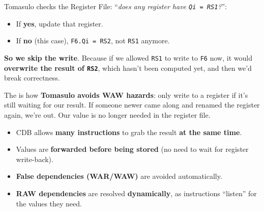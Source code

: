 \begin{examplebox}
\begin{equation*}
    \end{equation*}
    Tomasulo checks the Register File: ``\emph{does any register have \texttt{Qi = RS1}?}'':
    \begin{itemize}
        \item[\textcolor{Green3}{\faIcon{check-circle}}] If \textcolor{Green3}{\textbf{yes}}, update that register.
        \item[\textcolor{Red2}{\faIcon{times-circle}}] If \textcolor{Red2}{\textbf{no}} (this case), \texttt{F6.Qi = RS2}, not \texttt{RS1} anymore.
    \end{itemize}
    \textbf{So we skip the write}. Because if we allowed \texttt{RS1} to write to \texttt{F6} now, it would \textbf{overwrite the result of \texttt{RS2}}, which hasn't been computed yet, and then we'd break correctness.

    The is how \textbf{Tomasulo avoids WAW hazards}: only write to a register if it's still waiting for our result. If someone newer came along and renamed the register again, we're out. Our value is no longer needed in the register file.
\end{examplebox}

\begin{itemize}
    \item CDB allows \textbf{many instructions} to grab the result \textbf{at the same time}.
    \item Values are \textbf{forwarded before being stored} (no need to wait for register write-back).
    \item \textbf{False dependencies (WAR/WAW)} are avoided automatically.
    \item \textbf{RAW dependencies} are resolved \textbf{dynamically}, as instructions ``listen'' for the values they need.
\end{itemize}